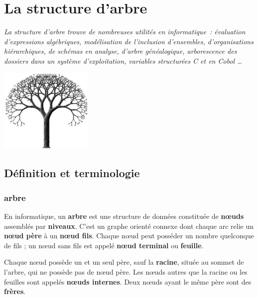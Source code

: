 \chapter{La structure d'arbre}

{\itshape La structure d'arbre trouve de nombreuses utilités en informatique~: 
évaluation d'expressions algébriques, modélisation de l'inclusion d'ensembles,
d'organisations hiérarchiques, de schémas en analyse, d'arbre généalogique, 
arborescence des dossiers dans un système d'exploitation, variables 
structurées C et en Cobol {\dots}}
\begin{center}
	\includegraphics[width=4.494cm,height=4.045cm]{image/a2012Logique2eme-img028.png}
\end{center}
	

\section{Définition et terminologie}

	\subsection{arbre}
		En informatique, un \textbf{arbre} est une structure de données 
		constituée de \textbf{n{\oe}uds} assemblés par \textbf{niveaux}. 
		C'est un graphe orienté connexe dont chaque arc relie un 
		\textbf{n{\oe}ud père} à un \textbf{n{\oe}ud fils}. 
		Chaque n{\oe}ud peut posséder un nombre quelconque de fils ; 
		un n{\oe}ud sans fils est appelé \textbf{n{\oe}ud terminal} 
		ou \textbf{feuille}.

		Chaque n{\oe}ud possède un et un seul père, sauf la \textbf{racine}, 
		située au sommet de l'arbre, qui ne possède pas de n{\oe}ud père. 
		Les n{\oe}uds autres que la racine ou les feuilles sont appelés 
		\textbf{n{\oe}uds internes}. Deux n{\oe}uds ayant le même père 
		sont des \textbf{frères}.

